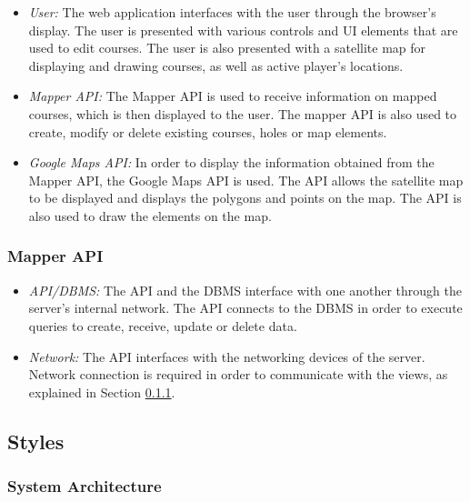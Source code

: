 \documentclass{article}
\begin{document}
    \begin{itemize}
        \item \textit{User:} The web application interfaces with the user
            through the browser's display. The user is presented with various
            controls and UI elements that are used to edit courses. The user is
            also presented with a satellite map for displaying and drawing
            courses, as well as active player's locations.
        \item \textit{Mapper API:} The Mapper API is used to receive
            information on mapped courses, which is then displayed to the user.
            The mapper API is also used to create, modify or delete existing
            courses, holes or map elements.
        \item \textit{Google Maps API:} In order to display the information
            obtained from the Mapper API, the Google Maps API is used. The API
            allows the satellite map to be displayed and displays the polygons
            and points on the map. The API is also used to draw the elements on
            the map. 
    \end{itemize}

    \subsubsection{Mapper API}

    \begin{itemize}
        \item \textit{API/DBMS:} The API and the DBMS interface with one another
            through the server's internal network. The API connects to the DBMS in
            order to execute queries to create, receive, update or delete data.
        \item \textit{Network:} The API interfaces with the networking devices of
            the server. Network connection is required in order to communicate with
            the views, as explained in Section \ref{sec:sysarch}.
    \end{itemize}

    \subsection{Styles}

    \subsubsection{System Architecture}
    \label{sec:sysarch}
    
\end{document}
